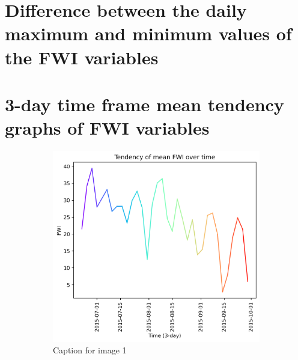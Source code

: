 \FloatBarrier

\section{Difference between the daily maximum and minimum values of the FWI variables}


\FloatBarrier

\section{3-day time frame mean tendency graphs of FWI variables}
\begin{figure}[h]
	\caption{HELLo}
	\centering
	\begin{subfigure}{0.49\textwidth}
		\centering
		\includegraphics[width=\textwidth]{graphs/2015/tendency/2015_tendency_graph_FWI.png}
		\caption{Caption for image 1}
		\label{fig:img1}
	\end{subfigure}
	\hfill
	\begin{subfigure}{0.49\textwidth}
		\centering

\end{subfigure}
\end{figure}
